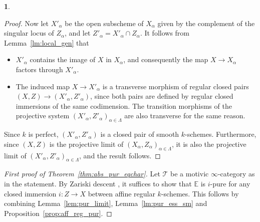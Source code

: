 \documentclass[JEP,XML,SOM,Unicode]{cedram}
\newcommand{\T}{\mathscr T}
\newcommand{\E}{\mathbb E}
\theoremstyle{remark}
\theoremstyle{definition}
\newtheorem{num}[thm]{}
\numberwithin{equation}{thm}
\begin{document}
\begin{num}
\begin{proof}
Now let $X'_\alpha$ be the open subscheme of $X_\alpha$ given by the complement of the singular locus of $Z_\alpha$, and let $Z'_\alpha=X'_\alpha\cap Z_\alpha$. It follows from Lemma~\ref{lm:local_gen} that
\begin{itemize}
\item $X'_\alpha$ contains the image of $X$ in $X_\alpha$, and consequently the map $X\to X_\alpha$ factors through $X'_\alpha$.
\item The induced map $X\to X'_\alpha$ is a transverse morphism of regular closed pairs $(X,Z)\to (X'_\alpha,Z'_\alpha)$, since both pairs are defined by regular closed immersions of the same codimension. The transition morphisms of the projective system $(X'_\alpha,Z'_\alpha)_{\alpha\in\Lambda}$ are also transverse for the same reason.
\end{itemize}
Since $k$ is perfect, $(X'_\alpha,Z'_\alpha)$ is a closed pair of smooth $k$-schemes. Furthermore, since $(X,Z)$ is the projective limit of $(X_\alpha,Z_\alpha)_{\alpha\in\Lambda}$, it is also the projective limit of $(X'_\alpha,Z'_\alpha)_{\alpha\in\Lambda}$, and the result follows.
\end{proof}

\begin{proof}[First proof of Theorem~\ref{thm:abs_pur_eqchar}]
Let $\T$ be a motivic $\infty$-category as in the statement.
By Zariski descent \cite[Prop.\,3.3.4]{CD3}, it suffices to show that $\E$ is $i$-pure for any closed immersion $i:Z\to X$ between affine regular $k$-schemes. This follows by combining Lemma~\ref{lem:pur_limit}, Lemma~\ref{lm:pur_ess_sm} and Proposition~\ref{prop:aff_reg_pur}.
\end{proof}
\end{num}
\end{document}
